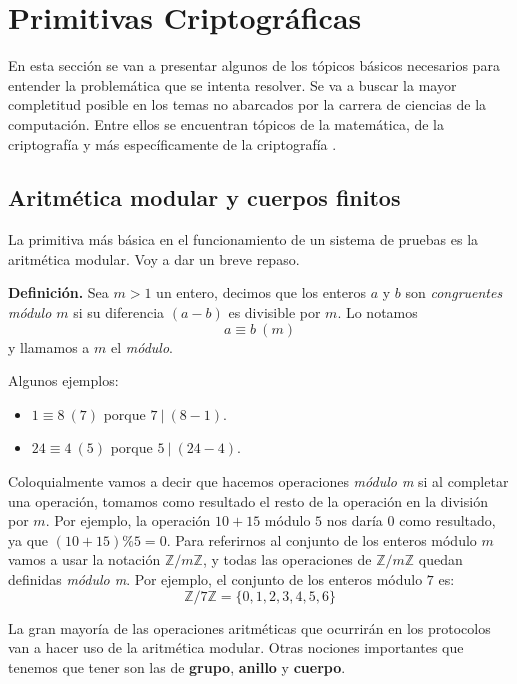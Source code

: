 \chapter{Primitivas Criptográficas}
En esta sección se van a presentar algunos de los tópicos básicos necesarios para entender la problemática que se intenta resolver. Se va a buscar la mayor completitud posible en los temas no abarcados por la carrera de ciencias de la computación. Entre ellos se encuentran tópicos de la matemática, de la criptografía y más específicamente de la criptografía \zk.


\section{Aritmética modular y cuerpos finitos}\label{sec:cuerpos}

La primitiva más básica en el funcionamiento de un sistema de pruebas es la aritmética modular. Voy a dar un breve repaso.

\vspace{1em}

\textbf{Definición.} Sea $m>1$ un entero, decimos que los enteros $a$ y $b$ son \textit{congruentes módulo $m$} si su diferencia $(a-b)$ es divisible por $m$. Lo notamos
$$a \equiv b~(m)$$ 
y llamamos a $m$ el \textit{módulo}.

\vspace{1em}

Algunos ejemplos:
\begin{itemize}
    \item $1 \equiv 8 ~ (7)$ porque $7 ~ | ~ (8-1)$.
    \item $24 \equiv 4 ~ (5)$ porque $5 ~ | ~ (24-4)$.
\end{itemize}

Coloquialmente vamos a decir que hacemos operaciones \textit{módulo m} si al completar una operación, tomamos como resultado el resto de la operación en la división por $m$. Por ejemplo, la operación $10 + 15$ módulo $5$ nos daría $0$ como resultado, ya que $(10+15)\%5 = 0$. Para referirnos al conjunto de los enteros módulo $m$ vamos a usar la notación $\mathbb{Z}/m\mathbb{Z}$, y todas las operaciones de $\mathbb{Z}/m\mathbb{Z}$ quedan definidas \textit{módulo m}. Por ejemplo, el conjunto de los enteros módulo $7$ es:
$$\mathbb{Z}/7\mathbb{Z} = \{0,1,2,3,4,5,6\}$$

La gran mayoría de las operaciones aritméticas que ocurrirán en los protocolos van a hacer uso de la aritmética modular. Otras nociones importantes que tenemos que tener son las de \textbf{grupo}, \textbf{anillo} y \textbf{cuerpo}.
\vspace{2em}

